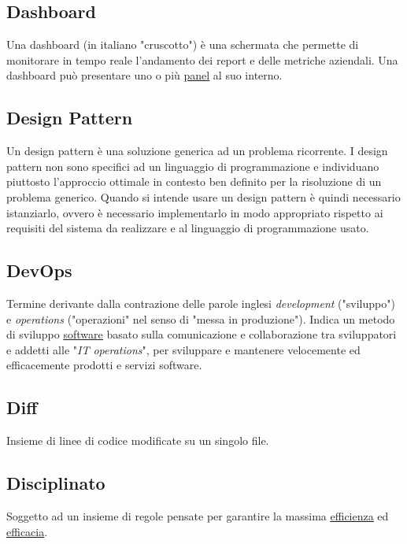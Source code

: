 	\subsection{Dashboard}
	\label{sec:dashboard}
	Una dashboard (in italiano "cruscotto") è una schermata che permette di monitorare in tempo reale l’andamento dei report e delle metriche aziendali. Una dashboard può presentare uno o più \underline{\hyperref[sec:panel]{panel}} al suo interno.


	\subsection{Design Pattern}
	\label{sec:designpatter}
	Un design pattern è una soluzione generica ad un problema ricorrente. I design pattern non sono specifici ad un linguaggio di programmazione e individuano piuttosto l'approccio ottimale in contesto ben definito per la risoluzione di un problema generico. Quando si intende usare un design pattern è quindi necessario istanziarlo, ovvero è necessario implementarlo in modo appropriato rispetto ai requisiti del sistema da realizzare e al linguaggio di programmazione usato.


	\subsection{DevOps}
	\label{sec:devops}
	Termine derivante dalla contrazione delle parole inglesi \emph{development} ("sviluppo") e \emph{operations} ("operazioni" nel senso di "messa in produzione"). Indica un metodo di sviluppo \underline{\hyperref[sec:prodottosoftware]{software}} basato sulla comunicazione e collaborazione tra sviluppatori e addetti alle "\emph{IT operations}", per sviluppare e mantenere velocemente ed efficacemente prodotti e servizi software.

	\subsection{Diff}
	\label{sec:diff}
	Insieme di linee di codice modificate su un singolo file.
	\subsection{Disciplinato}
	\label{sec:disciplinato}
	Soggetto ad un insieme di regole pensate per garantire la massima \underline{\hyperref[sec:efficienza]{efficienza}} ed \underline{\hyperref[sec:efficacia]{efficacia}}.

	\newpage


